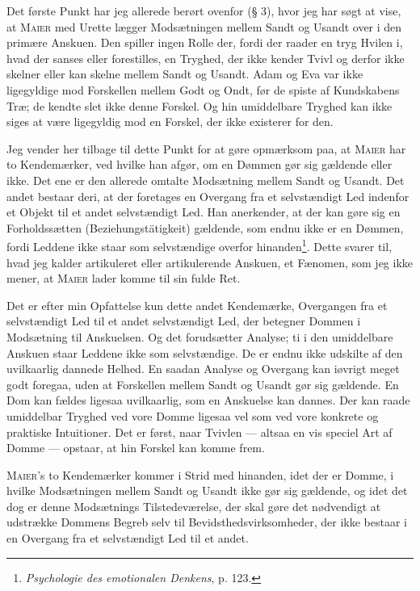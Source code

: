 \documentclass[12pt]{article}
\newcommand{\opage}[1]{\marginnote{\footnotesize\textit{[#1]}}}
\begin{document}
\setcounter{footnote}{0}%
\opage{26}Det første Punkt har jeg allerede berørt ovenfor (§ 3), hvor jeg har søgt at vise,
at \textsc{Maier} med Urette lægger Modsætningen mellem Sandt og Usandt over i den
primære Anskuen. Den spiller ingen Rolle der, fordi der raader en tryg Hvilen i,
hvad der sanses eller forestilles, en Tryghed, der ikke kender Tvivl og derfor ikke
skelner eller kan skelne mellem Sandt og Usandt. Adam og Eva var ikke
ligegyldige mod Forskellen mellem Godt og Ondt, før de spiste af Kundskabens Træ; de
kendte slet ikke denne Forskel. Og hin umiddelbare Tryghed kan ikke siges at
være ligegyldig mod en Forskel, der ikke existerer for den.

Jeg vender her tilbage til dette Punkt for at gøre opmærksom paa, at \textsc{Maier}
har to Kendemærker, ved hvilke han afgør, om en Dømmen gør sig gældende eller
ikke. Det ene er den allerede omtalte Modsætning mellem Sandt og Usandt. Det
andet bestaar deri, at der foretages en Overgang fra et selvstændigt Led indenfor
et Objekt til et andet selvstændigt Led. Han anerkender, at der kan gøre sig en
Forholdssætten (Beziehungstätigkeit) gældende, som endnu ikke er en Dømmen,
fordi Leddene ikke staar som selvstændige overfor hinanden\footnote{\textit{Psychologie
des emotionalen Denkens}, p. 123.}. Dette svarer til,
hvad jeg kalder artikuleret eller artikulerende Anskuen, et Fænomen, som jeg ikke
mener, at \textsc{Maier} lader komme til sin fulde Ret.

Det er efter min Opfattelse kun dette andet Kendemærke, Overgangen fra et
selvstændigt Led til et andet selvstændigt Led, der betegner Dommen i Modsætning
til Anskuelsen. Og det forudsætter Analyse; ti i den umiddelbare Anskuen staar
Leddene ikke som selvstændige. De er endnu ikke udskilte af den uvilkaarlig
dannede Helhed. En saadan Analyse og Overgang kan iøvrigt meget godt foregaa,
uden at Forskellen mellem Sandt og Usandt gør sig gældende. En Dom kan
fældes ligesaa uvilkaarlig, som en Anskuelse kan dannes. Der kan raade umiddelbar
Tryghed ved vore Domme ligesaa vel som ved vore konkrete og praktiske
Intuitioner. Det er først, naar Tvivlen --- altsaa en vis speciel Art af Domme --- opstaar,
at hin Forskel kan komme frem.

\textsc{Maier}'s to Kendemærker kommer i Strid med hinanden, idet der er Domme,
i hvilke Modsætningen mellem Sandt og Usandt ikke gør sig gældende, og idet det
dog er denne Modsætnings Tilstedeværelse, der skal gøre det nødvendigt at
udstrække Dommens Begreb selv til Bevidsthedsvirksomheder, der ikke bestaar i en
Overgang fra et selvstændigt Led til et andet.
\end{document}
